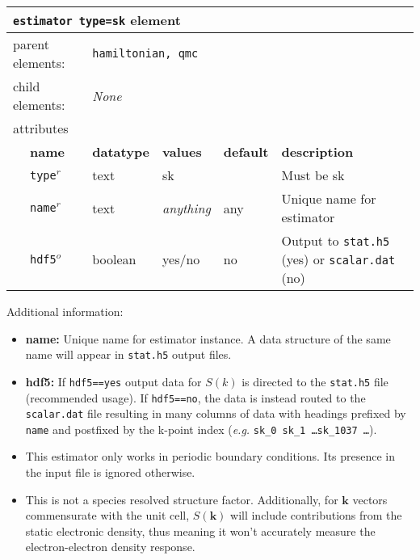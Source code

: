 
\FloatBarrier
\begin{table}[h]
\begin{center}
\begin{tabularx}{\textwidth}{l l l l l l }
\hline
\multicolumn{6}{l}{\texttt{estimator type=sk} element} \\
\hline
\multicolumn{2}{l}{parent elements:} & \multicolumn{4}{l}{\texttt{hamiltonian, qmc}}\\
\multicolumn{2}{l}{child  elements:} & \multicolumn{4}{l}{\textit{None}}\\
\multicolumn{2}{l}{attributes}  & \multicolumn{4}{l}{}\\
   & \bfseries name       & \bfseries datatype & \bfseries values  & \bfseries default   & \bfseries description \\
   & \texttt{type}$^r$    &  text              & sk      &                     & Must be sk       \\
   & \texttt{name}$^r$    &  text              & \textit{anything} & any                 & Unique name for estimator \\
   & \texttt{hdf5}$^o$    &  boolean           & yes/no            & no                  & Output to \texttt{stat.h5} (yes) or \texttt{scalar.dat} (no) \\
  \hline
\end{tabularx}
\end{center}
\end{table}
\FloatBarrier

Additional information:
\begin{itemize}
  \item{\textbf{name:} Unique name for estimator instance.  A data structure of the same name will appear in \texttt{stat.h5} output files.}
  \item{\textbf{hdf5:} If \texttt{hdf5==yes} output data for $S(k)$ is directed to the \texttt{stat.h5} file (recommended usage).  If \texttt{hdf5==no}, the data is instead routed to the \texttt{scalar.dat} file resulting in many columns of data with headings prefixed by \texttt{name} and postfixed by the k-point index (\textit{e.g.} \texttt{sk\_0 sk\_1 \ldots sk\_1037 \ldots}).}
  \item{This estimator only works in periodic boundary conditions.  Its presence in the input file is ignored otherwise.}
  \item{This is not a species resolved structure factor.  Additionally, for $\mathbf{k}$ vectors commensurate with the unit cell, $S(\mathbf{k})$ will include contributions from the static electronic density, thus meaning it won't accurately measure the electron-electron density response.  }
\end{itemize}

